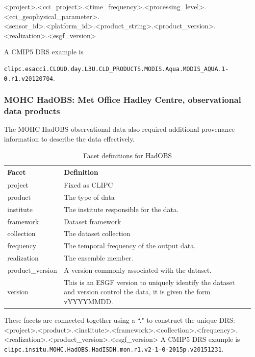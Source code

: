 \documentclass[final,1p,times,twocolumn,authoryear]{elsarticle}
\begin{document}
\noindent\textless{}project\textgreater{}.\textless{}cci\_project\textgreater{}.\textless{}time\_frequency\textgreater{}.\textless{}processing\_level\textgreater{}.\textless{}cci\_geophysical\_parameter\textgreater{}.\\\textless{}sensor\_id\textgreater{}.\textless{}platform\_id\textgreater{}.\textless{}product\_string\textgreater{}.\textless{}product\_version\textgreater{}.\textless{}realization\textgreater{}.\textless{}esgf\_version\textgreater{}

A CMIP5 DRS example is \newline
\small{\texttt{{clipc.esacci.CLOUD.day.L3U.CLD\_PRODUCTS.MODIS.Aqua.MODIS\_AQUA.1-0.r1.v20120704}}.\normalsize


\subsubsection{MOHC HadOBS: Met Office Hadley Centre, observational data products}
The MOHC HadOBS observational data also required additional provenance information to describe the data effectively.

\begin{table}[ht!]
\label{tab:hadobs}
\begin{tabular}{|p{3cm}|p{9.5cm}|}
\hline
\textbf{Facet}  & \textbf{Definition}  \\ \hline
project         & Fixed as CLIPC\\ \hline
product         & The type of data \\ \hline
institute       & The institute responsible for the data. \\ \hline
framework       & Dataset framework  \\ \hline
collection      & The dataset collection \\ \hline
frequency       & The temporal frequency of the output data.  \\ \hline
realization     & The ensemble member. \\ \hline
product\_version & A version commonly associated with the dataset. \\ \hline
version         & This is an ESGF version to uniquely identify the dataset and version control the data, it is given the form vYYYYMMDD. \\
\hline

\end{tabular}
\caption{Facet definitions for HadOBS}
\end{table}

These facets are connected together using a ``." to construct the unique DRS: 
\noindent\textless{}project\textgreater{}.\textless{}product\textgreater{}.\textless{}institute\textgreater{}.\textless{}framework\textgreater{}.\textless{}collection\textgreater{}.\textless{}frequency\textgreater{}.\\\textless{}realization\textgreater{}.\textless{}product\_version\textgreater{}.\textless{}esgf\_version\textgreater{}
A CMIP5 DRS example is \newline 
\small{\texttt{clipc.insitu.MOHC.HadOBS.HadISDH.mon.r1.v2-1-0-2015p.v20151231}}.\normalsize

}
\end{document}
